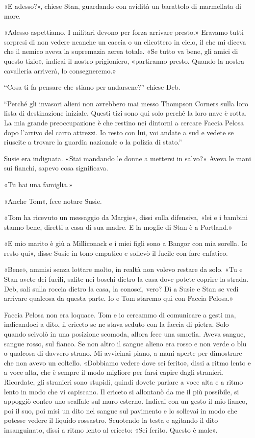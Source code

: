 «E adesso?», chiese Stan, guardando con avidità un barattolo di
marmellata di more.

«Adesso aspettiamo. I militari devono per forza arrivare presto.»
Eravamo tutti sorpresi di non vedere neanche un caccia o un elicottero
in cielo, il che mi diceva che il nemico aveva la supremazia aerea
totale. «Se tutto va bene, gli amici di questo tizio», indicai il nostro
prigioniero, «partiranno presto. Quando la nostra cavalleria arriverà,
lo consegneremo.»

``Cosa ti fa pensare che stiano per andarsene?'' chiese Deb.

``Perché gli invasori alieni non avrebbero mai messo Thompson Corners
sulla loro lista di destinazione iniziale. Questi tizi sono qui solo
perché la loro nave è rotta. La mia grande preoccupazione è che restino
nei dintorni a cercare Faccia Pelosa dopo l'arrivo del carro attrezzi.
Io resto con lui, voi andate a sud e vedete se riuscite a trovare la
guardia nazionale o la polizia di stato.''

Susie era indignata. «Stai mandando le donne a mettersi in salvo?» Aveva
le mani sui fianchi, sapevo cosa significava.

«Tu hai una famiglia.»

«Anche Tom», fece notare Susie.

«Tom ha ricevuto un messaggio da Margie», dissi sulla difensiva, «lei e
i bambini stanno bene, diretti a casa di sua madre. E la moglie di Stan
è a Portland.»

«E mio marito è giù a Milliconack e i miei figli sono a Bangor con mia
sorella. Io resto qui», disse Susie in tono empatico e sollevò il fucile
con fare enfatico.

«Bene», ammisi senza lottare molto, in realtà non volevo restare da
solo. «Tu e Stan avete dei fucili, salite nei boschi dietro la casa dove
potete coprire la strada. Deb, sali sulla roccia dietro la casa, la
conosci, vero? Dì a Susie e Stan se vedi arrivare qualcosa da questa
parte. Io e Tom staremo qui con Faccia Pelosa.»

\hfill\break

Faccia Pelosa non era loquace. Tom e io cercammo di comunicare a gesti
ma, indicandoci a dito, il criceto se ne stava seduto con la faccia di
pietra. Solo quando scivolò in una posizione scomoda, allora fece una
smorfia. Aveva sangue, sangue rosso, sul fianco. Se non altro il sangue
alieno era rosso e non verde o blu o qualcosa di davvero strano. Mi
avvicinai piano, a mani aperte per dimostrare che non avevo un coltello.
«Dobbiamo vedere dove sei ferito», dissi a ritmo lento e a voce alta,
che è sempre il modo migliore per farsi capire dagli stranieri.
Ricordate, gli stranieri sono stupidi, quindi dovete parlare a voce alta
e a ritmo lento in modo che vi capiscano. Il criceto si allontanò da me
il più possibile, si appoggiò contro uno scaffale sul muro esterno.
Indicai con un gesto il mio fianco, poi il suo, poi misi un dito nel
sangue sul pavimento e lo sollevai in modo che potesse vedere il liquido
rossastro. Scuotendo la testa e agitando il dito insanguinato, dissi a
ritmo lento al criceto: «Sei ferito. Questo è male».


